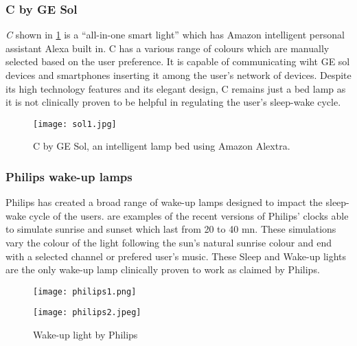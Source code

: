 \subsubsection{C by GE Sol}
\textit{C} shown in \cref{fig:c} is a ``all-in-one smart light'' \cite{gesol} which has Amazon intelligent personal assistant Alexa built in. C has a various range of colours which are manually selected based on the user preference. It is capable of communicating wiht GE sol devices and smartphones inserting it among the user's network of devices. Despite its high technology features and its elegant design, C remains just a bed lamp as it is not clinically proven to be helpful in regulating the user's sleep-wake cycle.
\begin{figure}[ht]
\centering
\texttt{[image: sol1.jpg]}
\caption{C by GE Sol, an intelligent lamp bed using Amazon Alextra.}
\label{fig:c}
\end{figure}

\subsubsection{Philips wake-up lamps}
Philips has created a broad range of wake-up lamps designed to impact the sleep-wake cycle of the users.  are examples of the recent versions of Philips' clocks able to simulate sunrise and sunset which last from 20 to 40 mn. These simulations vary the colour of the light following the sun's natural sunrise colour and end with a selected channel or prefered user's music. These Sleep and Wake-up lights are the only wake-up lamp clinically proven to work as claimed by Philips\cite{philips}. 

\begin{figure}[ht]
\centering
\begin{minipage}[b]{0.45\textwidth}
\texttt{[image: philips1.png]}
\label{fig:philips1}
\end{minipage}
\begin{minipage}[b]{0.45\textwidth}
\texttt{[image: philips2.jpeg]}
\label{fig:philips2}
\end{minipage}
\caption{Wake-up light by Philips}
\label{philips}
\end{figure}



